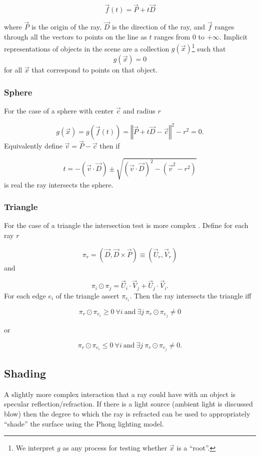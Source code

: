\documentclass[12pt]{article}
\begin{document}
$$ \vec{f}(t) = \vec{P} + t \vec{D} $$

\noindent where $\vec{P}$ is the origin of the ray, $\vec{D}$ is the direction of the ray, and $\vec{f}$ ranges through all the vectors to points on the line as $t$ ranges from $0$ to $+\infty$. Implicit representations of objects in the scene are a collection ${g(\vec{x})}$\footnote{We interpret $g$ as any process for testing whether $\vec{x}$ is a ``root''.} such that 
$$ g(\vec{x}) = 0 $$
for all $\vec{x}$ that correspond to points on that object. 

\subsubsection{Sphere}

For the case of a sphere \cite{wiki:Ray_tracing_(graphics)} with center $\vec{c}$ and radius $r$

$$g(\vec{x}) = g(\vec{f}(t)) = \left\Vert\vec{P}+t\vec{D}-\vec{c}\right\Vert^{2}-r^2 = 0.$$
Equivalently define $\vec{v} = \vec{P} - \vec{c}$ then if 

$$t =-(\vec{v}\cdot\vec{D})\pm\sqrt{(\vec{v}\cdot\vec{D})^2-(\vec{v}^2-r^2)} $$
is real the ray intersects the sphere.

\subsubsection{Triangle}
\label{subsec:triangle}
For the case of a triangle the intersection test is more complex \cite{doi:10.1080/10867651.2003.10487593}. Define for each ray $r$ 

$$\pi_r = (\vec{D},\vec{D} \times \vec{P}) \equiv (\vec{U}_r,\vec{V}_r)$$
and

$$\pi_i \odot \pi_j = \vec{U}_i \cdot \vec{V}_j + \vec{U}_j \cdot \vec{V}_i.$$
For each edge $e_i$ of the triangle assert $\pi_{e_i}$. Then the ray intersects the triangle iff

$$ \pi_r \odot \pi_{e_i} \geq 0 ~ \forall i~ \text{and}~ \exists j \: \pi_r \odot \pi_{e_j} \neq 0 $$
\begin{center}or\end{center}
$$ \pi_r \odot \pi_{e_i} \leq 0 ~ \forall i~ \text{and}~ \exists j \: \pi_r \odot \pi_{e_j} \neq 0. $$
\subsection{Shading}

A slightly more complex interaction that a ray could have with an object is specular reflection/refraction. If there is a light source (ambient light is discussed blow) then the degree to which the ray is refracted can be used to appropriately ``shade'' the surface using the Phong lighting model. 
\end{document}
